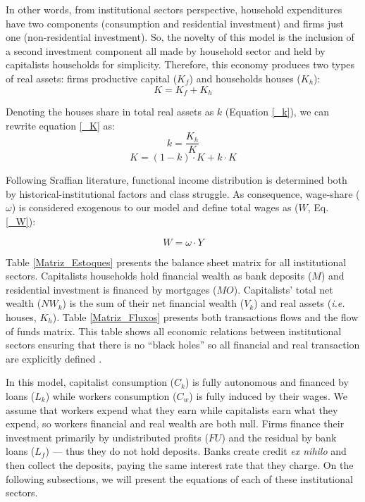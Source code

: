 \documentclass[11pt]{article}
\begin{document}
In other words, from institutional sectors perspective, household expenditures have two components (consumption and residential investment) and firms just one (non-residential investment).
So, the novelty of this model is the inclusion of a second investment component all made by household sector and held by capitalists households for simplicity. 
Therefore, this economy produces two types of real assets: firms productive capital (\(K_f\)) and households houses (\(K_h\)):
\begin{equation}
    \label{_K}
    K = K_f + K_h
\end{equation}

Denoting the houses share in total real assets as \(k\) (Equation \ref{_k}), we can rewrite equation \ref{_K} as:
\begin{equation}
\label{_k}
    k = \frac{K_h}{K}
\end{equation}
$$
K = (1-k)\cdot K + k\cdot K
$$

Following Sraffian literature, functional income distribution is determined both by historical-institutional factors and class struggle. 
As consequence, wage-share (\(\omega\)) is considered exogenous to our model and define total wages as (\(W\), Eq. \ref{_W}):

\begin{equation}
\label{_W}
    W = \omega\cdot Y
\end{equation}

Table \ref{Matriz_Estoques} presents the balance sheet matrix for all institutional sectors. 
Capitalists households hold financial wealth as bank deposits (\(M\)) and residential investment is financed by mortgages (\(MO\)).
Capitalists' total net wealth (\(NW_{k}\)) is the sum of their net financial wealth (\(V_{k}\)) and real assets (\textit{i.e.} houses, \(K_h\)).
Table  \ref{Matriz_Fluxos} presents both transactions flows and the flow of funds matrix. 
This table shows all economic relations between institutional sectors ensuring that there is no  ``black holes''
so all financial and real transaction are explicitly defined \cite{godley_monetary_2007,macedo_e_silva_peering_2011}.

In this model, capitalist consumption (\(C_k\)) is fully autonomous and financed by loans (\(L_{k}\)) while workers consumption (\(C_w\)) is fully induced by their wages.
We assume that workers expend what they earn while capitalists earn what they expend, so workers financial and real wealth are both null.
Firms finance their investment primarily by undistributed profits (\(FU\)) and the residual by bank loans (\(L_f\)) --- thus they do not hold deposits. 
Banks create credit \textit{ex nihilo} and then collect the deposits, paying the same interest rate that they charge.
On the following subsections, we will present the equations of each of these institutional sectors.
\end{document}

